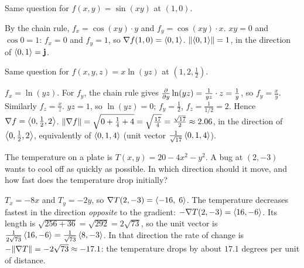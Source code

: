 \begin{problem}\label{prob:p15}
Same question for $f(x,y)=\sin(xy)$ at $(1,0)$.
\end{problem}
\begin{solution}
 By the chain rule, $f_x=\cos(xy)\cdot y$ and $f_y=\cos(xy)\cdot x$.
 $xy=0$ and $\cos0=1$: $f_x=0$ and $f_y=1$, so $\nabla f(1,0)=\left\langle 0,1 \right\rangle$.
 $\lVert\left\langle 0,1 \right\rangle\rVert=1$, in the direction of $\left\langle 0,1 \right\rangle=\mathbf{j}$.
\end{solution}

\begin{problem}\label{prob:p16}
Same question for $f(x,y,z)=x\ln(yz)$ at $\left(1,2,\frac12\right)$.
\end{problem}
\begin{solution}
 $f_x=\ln(yz)$. For $f_y$, the chain rule gives
$\frac{\partial }{\partial y}\ln(yz)=\frac{1}{yz}\cdot z=\frac1y$, so $f_y=\frac xy$. Similarly $f_z=\frac xz$.
 $yz=1$, so $\ln(yz)=0$; $f_y=\frac12$, $f_z=\frac{1}{1/2}=2$.
Hence $\nabla f=\left\langle 0,\frac12,2 \right\rangle$.
 $\lVert\nabla f\rVert=\sqrt{0+\frac14+4}=\sqrt{\frac{17}{4}}=\frac{\sqrt{17}}{2}\approx2.06$, in the
direction of $\left\langle 0,\frac12,2 \right\rangle$, equivalently of $\left\langle 0,1,4 \right\rangle$ (unit vector $\frac{1}{\sqrt{17}}\left\langle 0,1,4 \right\rangle$).
\end{solution}

\begin{problem}\label{prob:tdec}
The temperature on a plate is $T(x,y)=20-4x^2-y^2$. A bug at $(2,-3)$ wants to
cool off as quickly as possible. In which direction should it move, and how
fast does the temperature drop initially?
\end{problem}
\begin{solution}
 $T_x=-8x$ and $T_y=-2y$, so $\nabla T(2,-3)=\left\langle -16,\;6 \right\rangle$.
 The temperature decreases fastest in the direction
\emph{opposite} to the gradient: $-\nabla T(2,-3)=\left\langle 16,-6 \right\rangle$. Its length is
$\sqrt{256+36}=\sqrt{292}=2\sqrt{73}$, so the unit vector is $\frac{1}{2\sqrt{73}}\left\langle 16,-6 \right\rangle=\frac{1}{\sqrt{73}}\left\langle 8,-3 \right\rangle$.
 In that direction the rate of change is $-\lVert\nabla T\rVert=-2\sqrt{73}\approx-17.1$:
the temperature drops by about $17.1$ degrees per unit of distance.
\end{solution}

